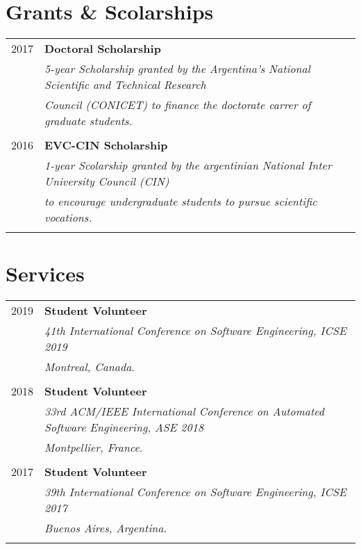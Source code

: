 \documentclass[a4paper,10pt]{article} %
\begin{document}
\section{Grants \& Scolarships}
\begin{tabular}{rl}
\\
\textsc{2017} & \textbf{Doctoral Scholarship} \\ 
& \textit{5-year Scholarship granted by the Argentina's National Scientific and Technical Research} \\
& \textit{Council (CONICET) to finance the doctorate carrer of graduate students.} \\ & \\

\textsc{2016} & \textbf{EVC-CIN Scholarship} \\ 
& \textit{1-year Scolarship granted by the argentinian National Inter University Council (CIN)} \\
& \textit{to encourage undergraduate students to pursue scientific vocations.} \\ & \\

\end{tabular}

\section{Services}
\begin{longtable}{rl}
\textsc{2019}	& \textbf{Student Volunteer} \\ 
& \textit{41th International Conference on Software Engineering, ICSE 2019} \\ 
& \textit{Montreal, Canada}. \\ & \\

\textsc{2018}	& \textbf{Student Volunteer} \\
& \textit{33rd ACM/IEEE International Conference on Automated Software Engineering, ASE 2018} \\
& \textit{Montpellier, France}. \\ & \\

\textsc{2017}	& \textbf{Student Volunteer} \\ 
& \textit{39th International Conference on Software Engineering, ICSE 2017} \\ 
& \textit{Buenos Aires, Argentina}. \\ & \\
\end{longtable}
\end{document}
